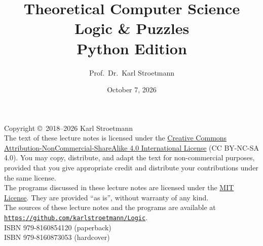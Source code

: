 \documentclass[11pt,twoside]{report}
\title{Theoretical Computer Science \\
       Logic \& Puzzles \\[0.3cm]
       {\large Python Edition}}
\author{Prof.~Dr.~Karl Stroetmann}
\date{October 7, 2026}
\begin{document}
\maketitle
\newpage
\thispagestyle{empty}
\vspace*{\fill}
\noindent
Copyright \copyright\ 2018--2026 Karl Stroetmann
\\[0.3cm]
The text of these lecture notes is licensed under the
\href{https://creativecommons.org/licenses/by-nc-sa/4.0/}{Creative Commons
Attribution-NonCommercial-ShareAlike 4.0 International License} (CC BY-NC-SA 4.0).
You may copy, distribute, and adapt the text for non-commercial purposes, provided that
you give appropriate credit and distribute your contributions under the same license.
\\[0.3cm]
The programs discussed in these lecture notes are licensed under the
\href{https://opensource.org/license/mit}{MIT License}.  They are provided ``as is'',
without warranty of any kind.
\\[0.3cm]
The sources of these lecture notes and the programs are available at
\\[0.2cm]
\hspace*{\fill}
\href{https://github.com/karlstroetmann/Logic}{\texttt{https://github.com/karlstroetmann/Logic}}.
\hspace*{\fill}
\\[0.3cm]
ISBN 979-8160854120 (paperback)
\\
ISBN 979-8160873053 (hardcover)
\tableofcontents

%
%
%


%






\printindex
\end{document}
